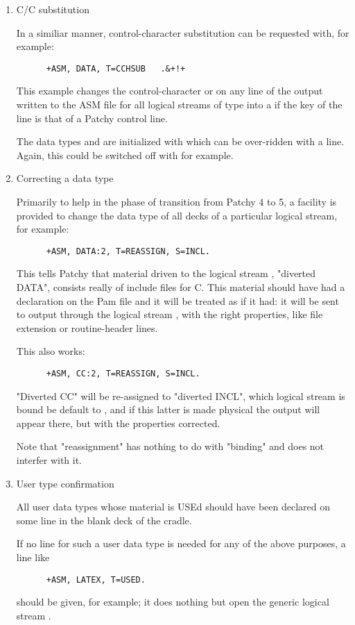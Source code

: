 \begin{enumerate}
\item
C/C substitution

In a similiar manner, control-character substitution can be requested with,
for example:
\begin{verbatim}
      +ASM, DATA, T=CCHSUB   .&+!+
\end{verbatim}
This example changes the control-character \Lit{&} or \Lit{!} on any line
of the output written to the ASM file for all logical streams of type
 into a \Lit{+} if
the key of the line is that of a Patchy control line.

The data types  and  are initialized with
 which can be over-ridden with a  line.
Again, this could be switched off
with  for example.

\item
Correcting a data type

Primarily to help in the phase of transition from Patchy 4 to 5,
a facility is provided to change the data type of all decks
of a particular logical stream, for example:
\begin{verbatim}
      +ASM, DATA:2, T=REASSIGN, S=INCL.
\end{verbatim}
This tells Patchy that material driven to the logical stream ,
"diverted DATA", consists really of include files for C. This material
should have had a  declaration on the Pam file and it will be
treated as if it had: it will be sent to output through the logical
stream , with the right properties, like file extension or
routine-header lines.

This also works:
\begin{verbatim}
      +ASM, CC:2, T=REASSIGN, S=INCL.
\end{verbatim}
"Diverted CC" will be re-assigned to "diverted INCL", which logical
stream is bound be default to , and if this latter is made
physical the output will appear there, but with the properties
corrected.

Note that "reassignment" has nothing to do with "binding" and does
not interfer with it.


\item
User type confirmation

All user data types whose material is USEd should have been declared on
some  line in the blank deck of the cradle.

If no  line for such a user data type is needed for any of the above
purposes, a line like
\begin{verbatim}
      +ASM, LATEX, T=USED.
\end{verbatim}
should be given, for example; it does nothing but open the generic logical
stream .


\end{enumerate}
